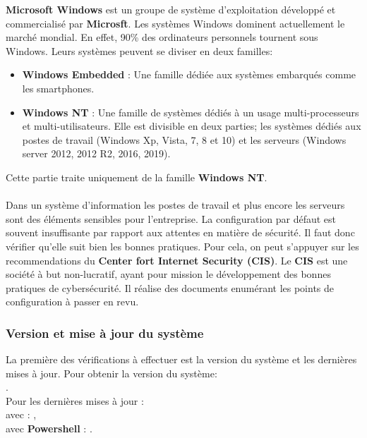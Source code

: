 \documentclass[twoside,a4paper,12pt,titlepage]{book}
\begin{document}
\textbf{Microsoft Windows} est un groupe de système d'exploitation développé et commercialisé par \textbf{Microsft}. Les systèmes Windows dominent actuellement le marché mondial. En effet, 90\% des ordinateurs personnels tournent sous Windows. Leurs systèmes peuvent se diviser en deux familles:
\begin{itemize}
	\item \textbf{Windows Embedded} : Une famille dédiée aux systèmes embarqués comme les smartphones.
	\item \textbf{Windows NT} : Une famille de systèmes dédiés à un usage multi-processeurs et multi-utilisateurs. Elle est divisible en deux parties; les systèmes dédiés aux postes de travail (Windows Xp, Vista, 7, 8 et 10) et les serveurs (Windows server 2012, 2012 R2, 2016, 2019).
\end{itemize}
Cette partie traite uniquement de la famille \textbf{Windows NT}.\\\\
Dans un système d'information les postes de travail et plus encore les serveurs sont des éléments sensibles pour l'entreprise. La configuration par défaut est souvent insuffisante par rapport aux attentes en matière de sécurité. Il faut donc vérifier qu'elle suit bien les bonnes pratiques. Pour cela, on peut s'appuyer sur les recommendations du \textbf{Center fort Internet Security (CIS)}. Le \textbf{CIS} est une société à but non-lucratif, ayant pour mission le développement des bonnes pratiques de cybersécurité. Il réalise des documents enumérant les points de configuration à passer en revu.

\subsubsection{Version et mise à jour du système}
La première des vérifications à effectuer est la version du système et les dernières mises à jour. Pour obtenir la version du système:\\
.\\
Pour les dernières mises à jour :\\
avec  : ,\\
avec \textbf{Powershell} : .
\end{document}
